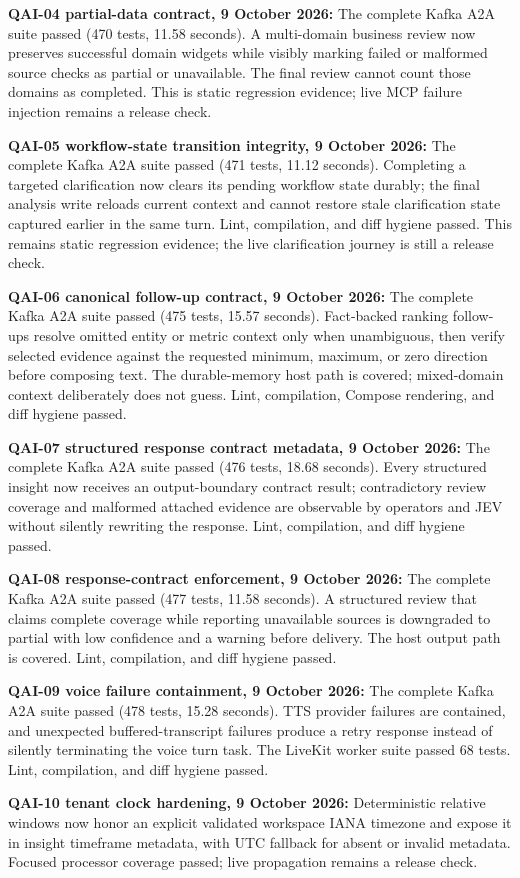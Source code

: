 \documentclass[10pt]{article}
\begin{document}
\colorbox{mist}{\parbox{0.96\textwidth}{\textbf{QAI-04 partial-data contract, 9 October 2026:} The complete Kafka A2A suite passed (470 tests, 11.58 seconds). A multi-domain business review now preserves successful domain widgets while visibly marking failed or malformed source checks as partial or unavailable. The final review cannot count those domains as completed. This is static regression evidence; live MCP failure injection remains a release check.}}

\colorbox{mist}{\parbox{0.96\textwidth}{\textbf{QAI-05 workflow-state transition integrity, 9 October 2026:} The complete Kafka A2A suite passed (471 tests, 11.12 seconds). Completing a targeted clarification now clears its pending workflow state durably; the final analysis write reloads current context and cannot restore stale clarification state captured earlier in the same turn. Lint, compilation, and diff hygiene passed. This remains static regression evidence; the live clarification journey is still a release check.}}

\colorbox{mist}{\parbox{0.96\textwidth}{\textbf{QAI-06 canonical follow-up contract, 9 October 2026:} The complete Kafka A2A suite passed (475 tests, 15.57 seconds). Fact-backed ranking follow-ups resolve omitted entity or metric context only when unambiguous, then verify selected evidence against the requested minimum, maximum, or zero direction before composing text. The durable-memory host path is covered; mixed-domain context deliberately does not guess. Lint, compilation, Compose rendering, and diff hygiene passed.}}

\colorbox{mist}{\parbox{0.96\textwidth}{\textbf{QAI-07 structured response contract metadata, 9 October 2026:} The complete Kafka A2A suite passed (476 tests, 18.68 seconds). Every structured insight now receives an output-boundary contract result; contradictory review coverage and malformed attached evidence are observable by operators and JEV without silently rewriting the response. Lint, compilation, and diff hygiene passed.}}

\colorbox{mist}{\parbox{0.96\textwidth}{\textbf{QAI-08 response-contract enforcement, 9 October 2026:} The complete Kafka A2A suite passed (477 tests, 11.58 seconds). A structured review that claims complete coverage while reporting unavailable sources is downgraded to partial with low confidence and a warning before delivery. The host output path is covered. Lint, compilation, and diff hygiene passed.}}

\colorbox{mist}{\parbox{0.96\textwidth}{\textbf{QAI-09 voice failure containment, 9 October 2026:} The complete Kafka A2A suite passed (478 tests, 15.28 seconds). TTS provider failures are contained, and unexpected buffered-transcript failures produce a retry response instead of silently terminating the voice turn task. The LiveKit worker suite passed 68 tests. Lint, compilation, and diff hygiene passed.}}
\colorbox{mist}{\parbox{0.96\textwidth}{\textbf{QAI-10 tenant clock hardening, 9 October 2026:} Deterministic relative windows now honor an explicit validated workspace IANA timezone and expose it in insight timeframe metadata, with UTC fallback for absent or invalid metadata. Focused processor coverage passed; live propagation remains a release check.}}
\end{document}

